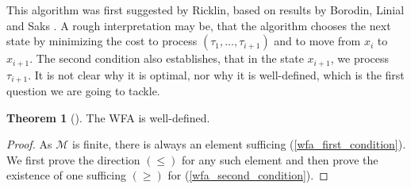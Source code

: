 \documentclass[10pt]{amsart}
\theoremstyle{definition}
\newtheorem{theorem}{Theorem}
\theoremstyle{remark}
\begin{document}
    \phantom{}

    This algorithm was first suggested by Ricklin, based on results by Borodin, Linial and Saks \cite[p. 123, p. 132]{Borodin}. A rough interpretation may be, that the algorithm chooses the next state by minimizing the cost to process \((\tau_1, ..., \tau_{i+1})\) and to move from \(x_i\) to \(x_{i+1}\). The second condition also establishes, that in the state \(x_{i+1}\), we process \(\tau_{i+1}\). It is not clear why it is optimal, nor why it is well-defined, which is the first question we are going to tackle.

    \begin{theorem}[{\cite[pp. 132-133]{Borodin}}]
        The WFA is well-defined.
    \end{theorem}

    \begin{proof}
        As \(\mathcal{M}\) is finite, there is always an element sufficing (\ref{wfa_first_condition}). We first prove the direction \((\leq)\) for any such element and then prove the existence of one sufficing \((\geq)\) for (\ref{wfa_second_condition}).


\end{proof}
\end{document}
